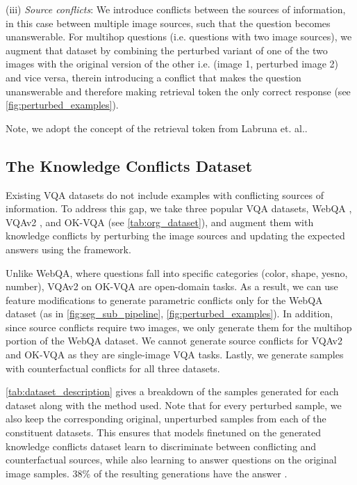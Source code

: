 \noindent(iii) \textit{Source conflicts}: We introduce conflicts between the sources of information, in this case between multiple image sources, such that the question becomes unanswerable. For multihop questions (i.e. questions with two image sources), we augment that dataset by combining the perturbed variant of one of the two images with the original version of the other i.e. (image 1, perturbed image 2) and vice versa, therein introducing a conflict that makes the question unanswerable and therefore making retrieval token \retlabel the only correct response (see \autoref{fig:perturbed_examples}). 

Note, we adopt the concept of the retrieval token \retlabel from Labruna et. al.\citep{labruna2024retrieve}.

\subsection{The Knowledge Conflicts Dataset}
Existing VQA datasets do not include examples with conflicting sources of information. To address this gap, we take three popular VQA datasets, WebQA \citep{chang_webqa_2021}, VQAv2 \citep{goyal2017making}, and OK-VQA \citep{marino_ok-vqa_2019} (see \autoref{tab:org_dataset}), and augment them with knowledge conflicts by perturbing the image sources and updating the expected answers using the \segsub framework.

Unlike WebQA, where questions fall into specific categories (color, shape, yesno, number), VQAv2 on OK-VQA are open-domain tasks. As a result, we can use feature modifications to generate parametric conflicts only for the WebQA dataset (as in \autoref{fig:seg_sub_pipeline}, \autoref{fig:perturbed_examples}). In addition, since source conflicts require two images, we only generate them for the multihop portion of the WebQA dataset. We cannot generate source conflicts for VQAv2 and OK-VQA as they are single-image VQA tasks. Lastly, we generate samples with counterfactual conflicts for all three datasets. 

\autoref{tab:dataset_description} gives a breakdown of the samples generated for each dataset along with the method used. Note that for every perturbed sample, we also keep the corresponding original, unperturbed samples from each of the constituent datasets. This ensures that models finetuned on the generated knowledge conflicts dataset learn to discriminate between conflicting and counterfactual sources, while also learning to answer questions on the original image samples. 38\% of the resulting generations have the answer \retlabel.

